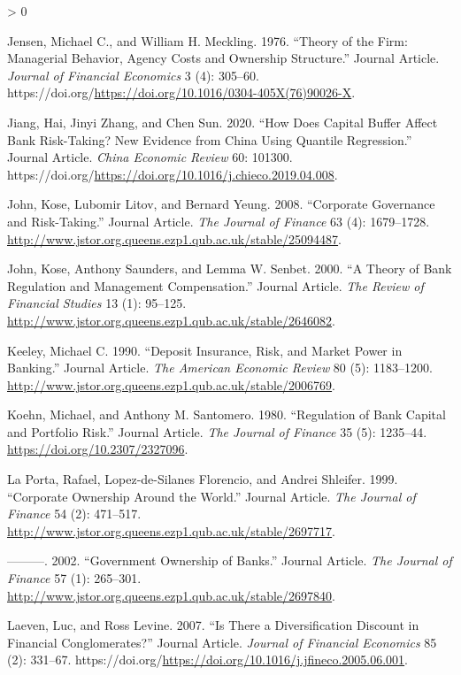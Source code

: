 \documentclass{article}
\newlength{\cslhangindent}
\newenvironment{CSLReferences}[2] %
 {%
  \setlength{\parindent}{0pt}
  \ifodd #1 \everypar{\setlength{\hangindent}{\cslhangindent}}\ignorespaces\fi
  \ifnum #2 > 0
  \setlength{\parskip}{#2\baselineskip}
  \fi
 }%
 {}
\begin{document}
\begin{CSLReferences}{1}{0}
\leavevmode\hypertarget{ref-RN52}{}%
Jensen, Michael C., and William H. Meckling. 1976. {``Theory of the
Firm: Managerial Behavior, Agency Costs and Ownership Structure.''}
Journal Article. \emph{Journal of Financial Economics} 3 (4): 305--60.
https://doi.org/\url{https://doi.org/10.1016/0304-405X(76)90026-X}.

\leavevmode\hypertarget{ref-RN53}{}%
Jiang, Hai, Jinyi Zhang, and Chen Sun. 2020. {``How Does Capital Buffer
Affect Bank Risk-Taking? New Evidence from China Using Quantile
Regression.''} Journal Article. \emph{China Economic Review} 60: 101300.
https://doi.org/\url{https://doi.org/10.1016/j.chieco.2019.04.008}.

\leavevmode\hypertarget{ref-RN54}{}%
John, Kose, Lubomir Litov, and Bernard Yeung. 2008. {``Corporate
Governance and Risk-Taking.''} Journal Article. \emph{The Journal of
Finance} 63 (4): 1679--1728.
\url{http://www.jstor.org.queens.ezp1.qub.ac.uk/stable/25094487}.

\leavevmode\hypertarget{ref-RN55}{}%
John, Kose, Anthony Saunders, and Lemma W. Senbet. 2000. {``A Theory of
Bank Regulation and Management Compensation.''} Journal Article.
\emph{The Review of Financial Studies} 13 (1): 95--125.
\url{http://www.jstor.org.queens.ezp1.qub.ac.uk/stable/2646082}.

\leavevmode\hypertarget{ref-RN56}{}%
Keeley, Michael C. 1990. {``Deposit Insurance, Risk, and Market Power in
Banking.''} Journal Article. \emph{The American Economic Review} 80 (5):
1183--1200.
\url{http://www.jstor.org.queens.ezp1.qub.ac.uk/stable/2006769}.

\leavevmode\hypertarget{ref-RN57}{}%
Koehn, Michael, and Anthony M. Santomero. 1980. {``Regulation of Bank
Capital and Portfolio Risk.''} Journal Article. \emph{The Journal of
Finance} 35 (5): 1235--44. \url{https://doi.org/10.2307/2327096}.

\leavevmode\hypertarget{ref-RN58}{}%
La Porta, Rafael, Lopez-de-Silanes Florencio, and Andrei Shleifer. 1999.
{``Corporate Ownership Around the World.''} Journal Article. \emph{The
Journal of Finance} 54 (2): 471--517.
\url{http://www.jstor.org.queens.ezp1.qub.ac.uk/stable/2697717}.

\leavevmode\hypertarget{ref-RN59}{}%
---------. 2002. {``Government Ownership of Banks.''} Journal Article.
\emph{The Journal of Finance} 57 (1): 265--301.
\url{http://www.jstor.org.queens.ezp1.qub.ac.uk/stable/2697840}.

\leavevmode\hypertarget{ref-RN60}{}%
Laeven, Luc, and Ross Levine. 2007. {``Is There a Diversification
Discount in Financial Conglomerates?''} Journal Article. \emph{Journal
of Financial Economics} 85 (2): 331--67.
https://doi.org/\url{https://doi.org/10.1016/j.jfineco.2005.06.001}.


\end{CSLReferences}
\end{document}
